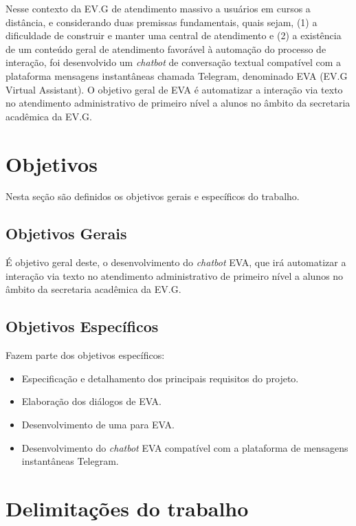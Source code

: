 Nesse contexto da EV.G de atendimento massivo a usuários em cursos a distância, e considerando duas premissas fundamentais, quais sejam, (1) a dificuldade de construir e manter uma central de atendimento e (2) a existência de um conteúdo geral de atendimento favorável à automação do processo de interação, foi desenvolvido um \textit{chatbot} de conversação textual compatível com a plataforma mensagens instantâneas chamada Telegram, denominado EVA (EV.G Virtual Assistant). O objetivo geral de EVA é automatizar a interação via texto no atendimento administrativo de primeiro nível a alunos no âmbito da secretaria acadêmica da EV.G.


\section{Objetivos}\label{cap:01:sec:01:objetivos}

Nesta seção são definidos os objetivos gerais e específicos do trabalho.


\subsection{Objetivos Gerais}\label{cap:01:sec:01:sub:01:objetivo-geral}

É objetivo geral deste, o desenvolvimento do \textit{chatbot} EVA, que irá automatizar a interação via texto no atendimento administrativo de primeiro nível a alunos no âmbito da secretaria acadêmica da EV.G.


\subsection{Objetivos Específicos}\label{cap:01:sec:01:sub:02:ojetivos-especificos}

Fazem parte dos objetivos específicos:

\begin{itemize}
    \item Especificação e detalhamento dos principais requisitos do projeto.
    \item Elaboração dos diálogos de EVA.
    \item Desenvolvimento de uma  para EVA.
    \item Desenvolvimento do \textit{chatbot} EVA compatível com a plataforma de mensagens instantâneas Telegram.
\end{itemize}


\section{Delimitações do trabalho}\label{cap:01:sec:03:delimitacao}


